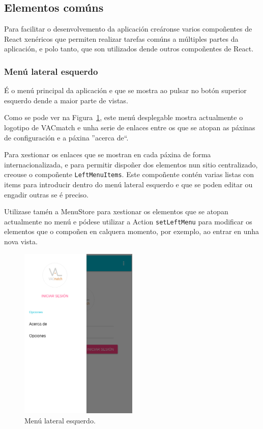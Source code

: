     \subsection{Elementos comúns}
    Para facilitar o desenvolvemento da aplicación creáronse varios 
compoñentes de React xenéricos que permiten realizar tarefas comúns a múltiples 
partes da aplicación, e polo tanto, que son utilizados dende outros compoñentes 
de React.

      \subsubsection{Menú lateral esquerdo}
      É o menú principal da aplicación e que se mostra ao pulsar no botón 
superior esquerdo dende a maior parte de vistas.

      Como se pode ver na Figura~\ref{fig:design:leftmenu}, este 
menú desplegable mostra actualmente o logotipo de VACmatch e unha 
serie de enlaces entre os que se atopan as páxinas de configuración e a páxina 
''acerca de``.

      Para xestionar os enlaces que se mostran en cada páxina de forma 
internacionalizada, e para permitir dispoñer dos elementos nun sitio 
centralizado, creouse o compoñente \lstinline{LeftMenuItems}.
      Este compoñente contén varias listas con items para introducir dentro do 
menú lateral esquerdo e que se poden editar ou engadir outras se é 
preciso.

      Utilizase tamén a MenuStore para xestionar os elementos que 
se atopan actualmente no menú e pódese utilizar a Action 
\lstinline{setLeftMenu} para modificar os elementos que o compoñen en calquera 
momento, por exemplo, ao 
entrar en unha nova vista.

      \begin{figure}[h!]
        \begin{center}
        \includegraphics[width=0.5\textwidth]{./img/demo/1_left_menu.png}
        \caption{Menú lateral esquerdo.}
        \label{fig:design:leftmenu}
        \end{center}
      \end{figure}


